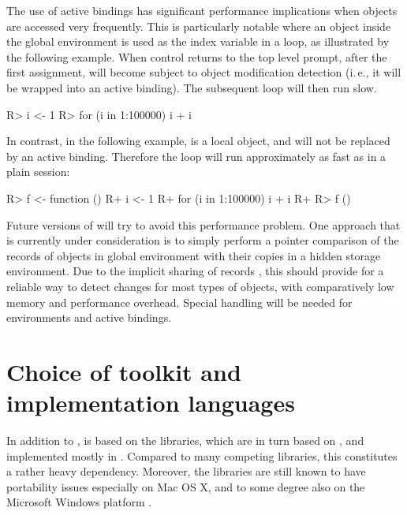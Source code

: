 The use of active bindings has significant performance implications when
objects are accessed very frequently. This is particularly notable where an
object inside the global environment is used as the index variable in a loop,
as illustrated by the following example. When control returns to the top level
prompt, after the first assignment,  will become subject to object modification
detection (i.\,e., it will be wrapped into an active
binding). The subsequent  loop will then run slow.

\begin{Code}
R> i <- 1
R> for (i in 1:100000) i + i
\end{Code}

In contrast, in the following example,  is a local object, and will not
be replaced by an active binding. Therefore the loop will run approximately as fast
as in a plain  session:

\begin{Code}
R> f <- function () {
R+    i <- 1
R+    for (i in 1:100000) i + i
R+ }
R> f ()
\end{Code}

Future versions of  will try to avoid this performance problem. 
One approach that is currently under consideration is to simply perform
a pointer comparison of the  records of objects in global environment with
their copies in a hidden storage environment. Due to the implicit sharing of
 records \citep{RDCT2010a, RDCT2010b}, this should provide for a reliable
way to detect changes for most types of  objects, with comparatively low memory
and performance overhead. Special handling will be needed for environments and
active bindings.

\section{Choice of toolkit and implementation languages}
\label{sec:technical_toolkit}
In addition to ,  is based on the  libraries, which are in turn based
on , and implemented mostly in . Compared to many competing libraries,
this constitutes a rather heavy dependency. Moreover, the  libraries are
still known to have portability issues especially on Mac OS X, and to some degree
also on the Microsoft Windows platform \citep{Jarvis2010}.

